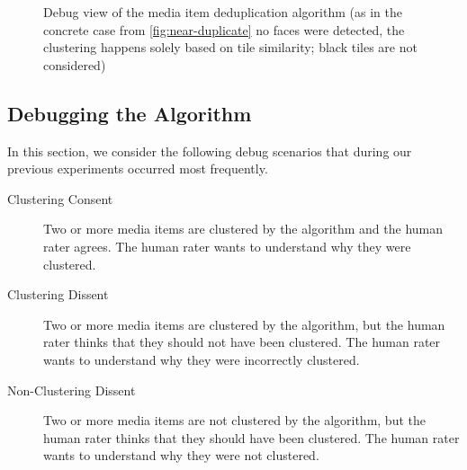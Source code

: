 \documentclass{article}
\begin{document}
\begin{figure}[b!]
  \centering
  \caption{Debug view of the media item deduplication algorithm
    (as in the concrete case from \autoref{fig:near-duplicate} no faces were detected,
    the clustering happens solely based on tile similarity;
    black tiles are not considered)}
  \label{fig:algorithmdebug}  
\end{figure}

\subsection{Debugging the Algorithm}
\label{sec:debugging-the-algorithm}

In this section, we consider the following debug scenarios
that during our previous experiments occurred most frequently.

\begin{description}
  \item[Clustering Consent]
    Two or more media items are clustered by the algorithm
    and the human rater agrees.
    The human rater wants to understand why they were clustered.
  \item[Clustering Dissent]
    Two or more media items are clustered by the algorithm,
    but the human rater thinks that they should not have been clustered.
    The human rater wants to understand why they were incorrectly clustered.
  \item[Non-Clustering Dissent]
    Two or more media items are not clustered by the algorithm,
    but the human rater thinks that they should have been clustered.
    The human rater wants to understand why they were not clustered.
\end{description}
\end{document}

